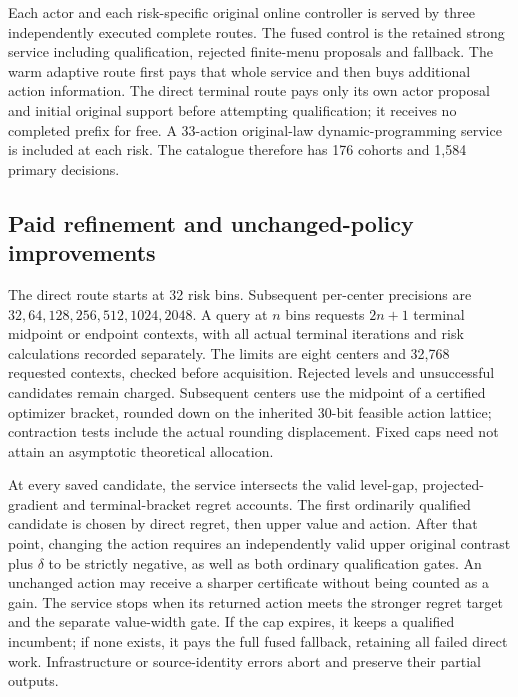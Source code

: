 Each actor and each risk-specific original online controller is served by
three independently executed complete routes. The fused control is the
retained strong service including qualification, rejected finite-menu
proposals and fallback. The warm adaptive route first pays that whole
service and then buys additional action information. The direct terminal
route pays only its own actor proposal and initial original support before
attempting qualification; it receives no completed prefix for free. A
33-action original-law dynamic-programming service is included at each risk.
The catalogue therefore has 176 cohorts and 1,584 primary decisions.

\subsection{Paid refinement and unchanged-policy improvements}

The direct route starts at 32 risk bins. Subsequent per-center precisions
are $32,64,128,256,512,1024,2048$. A query at $n$ bins requests
$2n+1$ terminal midpoint or endpoint contexts, with all actual terminal
iterations and risk calculations recorded separately. The limits are eight
centers and 32,768 requested contexts, checked before acquisition. Rejected
levels and unsuccessful candidates remain charged. Subsequent centers use
the midpoint of a certified optimizer bracket, rounded down on the inherited
30-bit feasible action lattice; contraction tests include the actual rounding
displacement. Fixed caps need not attain an asymptotic theoretical allocation.

At every saved candidate, the service intersects the valid level-gap,
projected-gradient and terminal-bracket regret accounts. The first ordinarily
qualified candidate is chosen by direct regret, then upper value and action.
After that point, changing the action requires an independently valid upper
original contrast plus $\delta$ to be strictly negative, as well as both
ordinary qualification gates. An unchanged action may receive a sharper
certificate without being counted as a gain. The service stops when its
returned action meets the stronger regret target and the separate value-width
gate. If the cap expires, it keeps a qualified incumbent; if none exists, it
pays the full fused fallback, retaining all failed direct work. Infrastructure
or source-identity errors abort and preserve their partial outputs.

